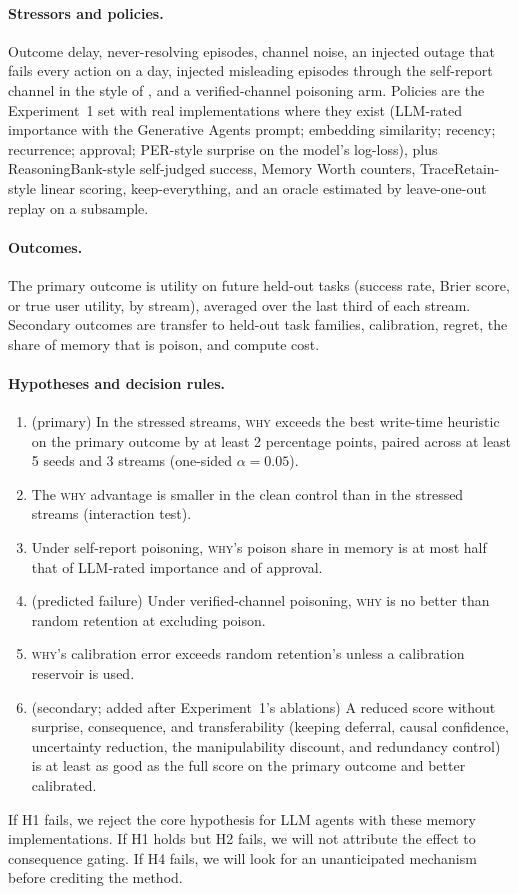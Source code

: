 \documentclass[11pt]{article}
\newcommand{\WHY}{\textsc{why}}
\begin{document}
\paragraph{Stressors and policies.} Outcome delay, never-resolving episodes, channel noise, an injected outage that fails every action on a day, injected misleading episodes through the self-report channel in the style of \citep{dong2025minja}, and a verified-channel poisoning arm. Policies are the Experiment~1 set with real implementations where they exist (LLM-rated importance with the Generative Agents prompt; embedding similarity; recency; recurrence; approval; PER-style surprise on the model's log-loss), plus ReasoningBank-style self-judged success, Memory Worth counters, TraceRetain-style linear scoring, keep-everything, and an oracle estimated by leave-one-out replay on a subsample.

\paragraph{Outcomes.} The primary outcome is utility on future held-out tasks (success rate, Brier score, or true user utility, by stream), averaged over the last third of each stream. Secondary outcomes are transfer to held-out task families, calibration, regret, the share of memory that is poison, and compute cost.

\paragraph{Hypotheses and decision rules.}
\begin{enumerate}[label=\textbf{H\arabic*},leftmargin=2.2em]
\item (primary) In the stressed streams, \WHY{} exceeds the best write-time heuristic on the primary outcome by at least 2 percentage points, paired across at least 5 seeds and 3 streams (one-sided $\alpha=0.05$).
\item The \WHY{} advantage is smaller in the clean control than in the stressed streams (interaction test).
\item Under self-report poisoning, \WHY{}'s poison share in memory is at most half that of LLM-rated importance and of approval.
\item (predicted failure) Under verified-channel poisoning, \WHY{} is no better than random retention at excluding poison.
\item \WHY{}'s calibration error exceeds random retention's unless a calibration reservoir is used.
\item (secondary; added after Experiment~1's ablations) A reduced score without surprise, consequence, and transferability (keeping deferral, causal confidence, uncertainty reduction, the manipulability discount, and redundancy control) is at least as good as the full score on the primary outcome and better calibrated.
\end{enumerate}
\noindent If H1 fails, we reject the core hypothesis for LLM agents with these memory implementations. If H1 holds but H2 fails, we will not attribute the effect to consequence gating. If H4 fails, we will look for an unanticipated mechanism before crediting the method.
\end{document}
